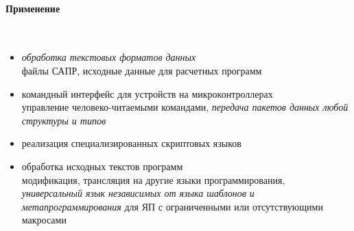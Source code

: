 \clearpage
\paragraph{Применение}\ \\ \bigskip

\begin{itemize}[nosep]
\item \emph{обработка текстовых форматов данных}\\
	файлы САПР, исходные данные для расчетных программ
\item командный интерфейс для устройств на микроконтроллерах\\
	управление человеко-читаемыми командами, \emph{передача пакетов данных
	любой структуры и типов}
\item реализация специализированных скриптовых языков
\item обработка исходных текстов программ\\
	модификация, трансляция на другие языки программирования,\\ 
	\emph{универсальный язык независимых от языка шаблонов и метапрограммирования}
	для ЯП с ограниченными или отсутствующими макросами
\end{itemize}



\secup
